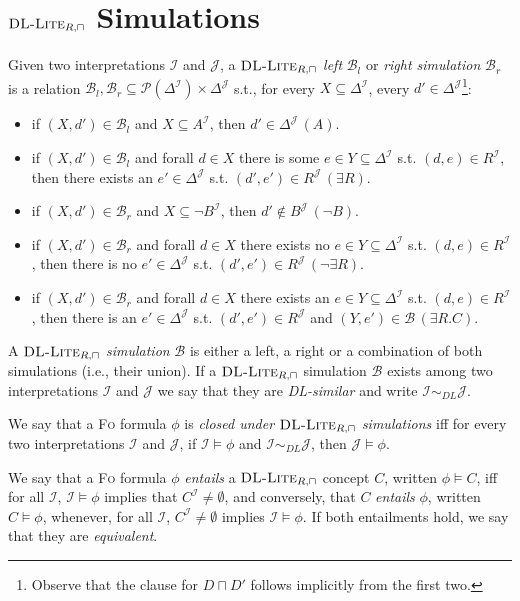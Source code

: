 \documentclass[11pt]{llncs}
\newcommand{\logic}[1]{\textsc{#1}\xspace}
\newcommand{\FOL}{\logic{Fo}}
\newcommand{\g}[1]{\logic{#1}}
\newcommand{\inte}{\f{I}}
\newcommand{\tup}[1]{(#1)}
\newcommand{\f}[1]{\mathcal{#1}}
\newcommand{\dlliterc}{\g{DL-Lite}_{R,\sqcap}\xspace}
\begin{document}
\section{$\dlliterc$ Simulations}\label{three}


Given two interpretations $\f{I}$ and $\f{J}$, a 
{\em $\dlliterc$ left} $\f{B}_l$ or {\em right simulation} $\f{B}_r$ 
is a relation $\f{B}_l, \f{B}_r \subseteq \f{P}(\Delta^{\f{I}}) \times 
\Delta^{\f{J}}$ s.t., for every $X \subseteq \Delta^{\f{I}}$, every
$d' \in \Delta^{\f{J}}$\footnote{Observe that the clause for $D \sqcap D'$ follows implicitly from the first two.}:
\begin{itemize}
\item if $\tup{X,d'} \in \f{B}_l$ and $X \subseteq A^{\f{I}}$, then $d' \in \Delta^{\f{J}} \, (A)$.
\item if $\tup{X,d'} \in \f{B}_l$ and forall $d \in X$ there is some $e \in Y \subseteq \Delta^{\f{I}}$ 
s.t. $\tup{d,e} \in R^{\f{I}}$, then there exists an $e' \in \Delta^{\f{J}}$ s.t.
$\tup{d',e'} \in R^{\f{J}} \, (\exists R)$.
\item if $\tup{X,d'} \in \f{B}_r$ and $X \subseteq \neg B^{\f{I}}$, then $d' \not\in B^{\f{J}} \, (\neg B)$.
\item if $\tup{X,d'} \in \f{B}_r$ and forall $d \in X$ there exists no $e \in Y \subseteq \Delta^{\f{I}}$ s.t. 
$\tup{d,e} \in R^{\f{I}}$, then there is no $e' \in \Delta^{\f{J}}$ s.t.
$\tup{d',e'} \in R^{\f{J}} \, (\neg \exists R)$.
\item if $\tup{X,d'} \in \f{B}_r$ and forall $d \in X$ there exists an $e \in Y \subseteq \Delta^{\f{I}}$ s.t. 
$\tup{d,e} \in R^{\f{I}}$, then there is an $e' \in \Delta^{\f{J}}$ s.t.
$\tup{d',e'} \in R^{\f{J}}$ and $\tup{Y,e'} \in \f{B} \, (\exists R . C)$.
\end{itemize}

A {\em $\dlliterc$ simulation} $\f{B}$ is either a left, a
right or a combination of both simulations (i.e., their union). 
If a $\dlliterc$ simulation $\f{B}$ exists
among two interpretations ${\f{I}}$ and ${\f{J}}$ we say that
they are {\em DL-similar} and write ${\f{I}} \sim_{DL} {\f{J}}$.

We say that a \FOL formula $\phi$ is {\em closed under $\dlliterc$
simulations} iff for every two interpretations $\f{I}$ and $\f{J}$,
if $\f{I} \models \phi$ and $\f{I} \sim_{DL} \f{J}$, then $\f{J} \models \phi$.

We say that a \FOL formula $\phi$ {\em entails} 
a $\dlliterc$ concept $C$,
written $\phi \models C$,
iff for all $\inte$, $\inte \models \phi$ implies
that $C^{\inte} \neq \emptyset$, and conversely, that
$C$ {\em entails} $\phi$, written $C \models \phi$, whenever, for all
$\inte$, $C^{\inte} \neq \emptyset$ implies $\inte \models \phi$.
If both entailments hold, we say that they are {\em equivalent}.
\end{document}
